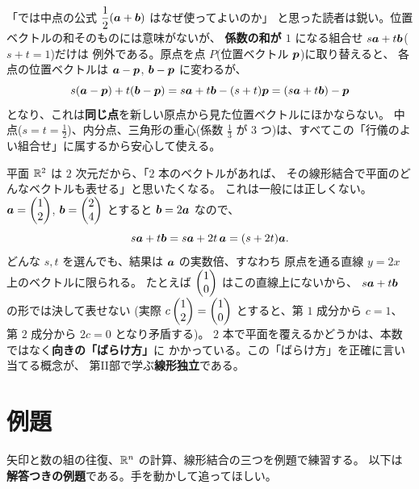 \begin{chui}
「では中点の公式 $\dfrac{1}{2}(\bm{a} + \bm{b})$ はなぜ使ってよいのか」
と思った読者は鋭い。位置ベクトルの和そのものには意味がないが、
\textbf{係数の和が $1$} になる組合せ $s\bm{a} + t\bm{b}$($s + t = 1$)だけは
例外である。原点を点 $P$(位置ベクトル $\bm{p}$)に取り替えると、
各点の位置ベクトルは $\bm{a} - \bm{p}$, $\bm{b} - \bm{p}$ に変わるが、
\[
s(\bm{a} - \bm{p}) + t(\bm{b} - \bm{p})
= s\bm{a} + t\bm{b} - (s + t)\bm{p}
= (s\bm{a} + t\bm{b}) - \bm{p}
\]
となり、これは\textbf{同じ点}を新しい原点から見た位置ベクトルにほかならない。
中点($s = t = \frac{1}{2}$)、内分点、三角形の重心(係数 $\frac{1}{3}$ が
$3$ つ)は、すべてこの「行儀のよい組合せ」に属するから安心して使える。
\end{chui}

\begin{hanrei}[$2$ 本あれば平面を表せるとは限らない]\label{hanrei:parallel}
平面 $\mathbb{R}^2$ は $2$ 次元だから、「$2$ 本のベクトルがあれば、
その線形結合で平面のどんなベクトルも表せる」と思いたくなる。
これは一般には正しくない。$\bm{a} = \begin{pmatrix}1 \\ 2\end{pmatrix}$,
$\bm{b} = \begin{pmatrix}2 \\ 4\end{pmatrix}$ とすると $\bm{b} = 2\bm{a}$ なので、
\[
s\bm{a} + t\bm{b} = s\bm{a} + 2t\,\bm{a} = (s + 2t)\bm{a}.
\]
どんな $s, t$ を選んでも、結果は $\bm{a}$ の実数倍、すなわち
原点を通る直線 $y = 2x$ 上のベクトルに限られる。
たとえば $\begin{pmatrix}1 \\ 0\end{pmatrix}$ はこの直線上にないから、
$s\bm{a} + t\bm{b}$ の形では決して表せない
(実際 $c\begin{pmatrix}1 \\ 2\end{pmatrix} = \begin{pmatrix}1 \\ 0\end{pmatrix}$ とすると、第 $1$ 成分から $c = 1$、
第 $2$ 成分から $2c = 0$ となり矛盾する)。
$2$ 本で平面を覆えるかどうかは、本数ではなく\textbf{向きの「ばらけ方」}に
かかっている。この「ばらけ方」を正確に言い当てる概念が、
第II部で学ぶ\textbf{線形独立}である。
\end{hanrei}

\section{例題}

矢印と数の組の往復、$\mathbb{R}^n$ の計算、線形結合の三つを例題で練習する。
以下は\textbf{解答つきの例題}である。手を動かして追ってほしい。

